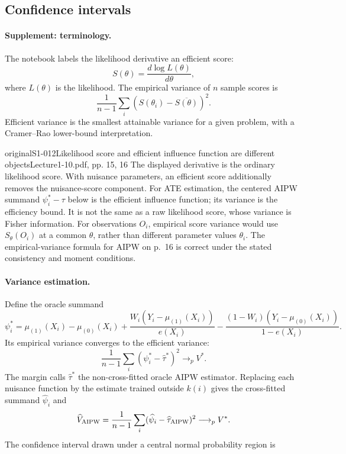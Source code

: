 \subsection{Confidence intervals}
\paragraph{Supplement: terminology.}
The notebook labels the likelihood derivative an efficient score:
\[
S(\theta)=\frac{d\log L(\theta)}{d\theta},
\]
where $L(\theta)$ is the likelihood. The empirical variance of $n$ sample scores is
\[
\frac1{n-1}\sum_i(S(\theta_i)-\overline{S(\theta)})^2.
\]
Efficient variance is the smallest attainable variance for a given problem, with a Cramer--Rao lower-bound interpretation.
\begin{reviewnote}{original}{S1-012}{Likelihood score and efficient influence function are different objects}{Lecture1-10.pdf, pp. 15, 16}
The displayed derivative is the ordinary likelihood score. With nuisance parameters, an efficient score additionally removes the nuisance-score component. For ATE estimation, the centered AIPW summand $\psi_i^*-\tau$ below is the efficient influence function; its variance is the efficiency bound. It is not the same as a raw likelihood score, whose variance is Fisher information. For observations $O_i$, empirical score variance would use $S_\theta(O_i)$ at a common $\theta$, rather than different parameter values $\theta_i$. The empirical-variance formula for AIPW on p.~16 is correct under the stated consistency and moment conditions.
\end{reviewnote}


\paragraph{Variance estimation.}
Define the oracle summand
\[
\psi_i^*=\mu_{(1)}(X_i)-\mu_{(0)}(X_i)
+\frac{W_i(Y_i-\mu_{(1)}(X_i))}{e(X_i)}
-\frac{(1-W_i)(Y_i-\mu_{(0)}(X_i))}{1-e(X_i)}.
\]
Its empirical variance converges to the efficient variance:
\[
\frac1{n-1}\sum_i(\psi_i^*-\widehat\tau^*)^2\longrightarrow_p V^*.
\]
The margin calls $\widehat\tau^*$ the non-cross-fitted oracle AIPW estimator.
 Replacing each nuisance function by the estimate trained outside $k(i)$ gives the cross-fitted summand $\widehat\psi_i$ and
\[
\widehat V_{\rm AIPW}=\frac1{n-1}\sum_i(\widehat\psi_i-\widehat\tau_{\rm AIPW})^2\longrightarrow_p V^*.
\]
The confidence interval drawn under a central normal probability region is
\begin{center}\end{center}

